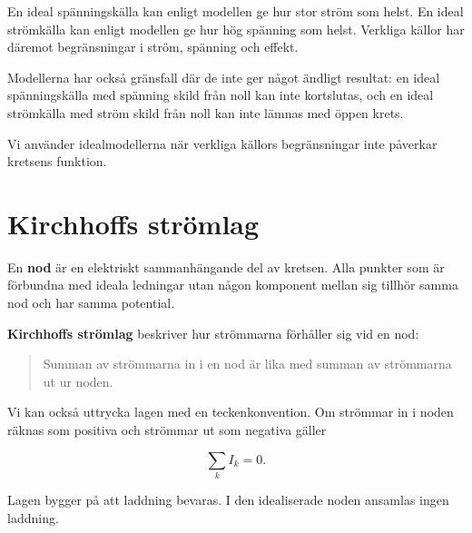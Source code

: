 \documentclass[
  swedish,
  11pt,
  a4paper,
  DIV=11,
  numbers=noendperiod,
  twoside,
  open=any]{scrreprt}
\begin{document}
\begin{tcolorbox}[enhanced jigsaw, arc=.35mm, bottomrule=.15mm, bottomtitle=1mm, breakable, colback=white, colbacktitle=quarto-callout-important-color!10!white, colframe=quarto-callout-important-color-frame, coltitle=black, left=2mm, leftrule=.75mm, opacityback=0, opacitybacktitle=0.6, rightrule=.15mm, title=\textcolor{quarto-callout-important-color}{\faExclamation}\hspace{0.5em}{Ideala källor är modeller}, titlerule=0mm, toprule=.15mm, toptitle=1mm]

En ideal spänningskälla kan enligt modellen ge hur stor ström som helst.
En ideal strömkälla kan enligt modellen ge hur hög spänning som helst.
Verkliga källor har däremot begränsningar i ström, spänning och effekt.

Modellerna har också gränsfall där de inte ger något ändligt resultat:
en ideal spänningskälla med spänning skild från noll kan inte
kortslutas, och en ideal strömkälla med ström skild från noll kan inte
lämnas med öppen krets.

Vi använder idealmodellerna när verkliga källors begränsningar inte
påverkar kretsens funktion.

\end{tcolorbox}

\section{Kirchhoffs strömlag}\label{sec-grunder-kirchhoffs-stromlag}

En \textbf{nod} är en elektriskt sammanhängande del av kretsen. Alla
punkter som är förbundna med ideala ledningar utan någon komponent
mellan sig tillhör samma nod och har samma potential.

\textbf{Kirchhoffs strömlag} beskriver hur strömmarna förhåller sig vid
en nod:

\begin{quote}
Summan av strömmarna in i en nod är lika med summan av strömmarna ut ur
noden.
\end{quote}

Vi kan också uttrycka lagen med en teckenkonvention. Om strömmar in i
noden räknas som positiva och strömmar ut som negativa gäller

\[
\boxed{\sum_k I_k = 0}.
\]

Lagen bygger på att laddning bevaras. I den idealiserade noden ansamlas
ingen laddning.
\end{document}
